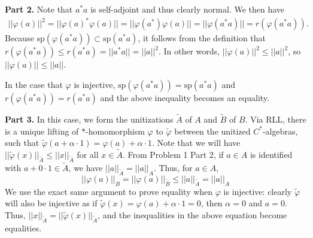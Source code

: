 \documentclass[aps,pra,showpacs,notitlepage,onecolumn,superscriptaddress,nofootinbib]{revtex4-1}
\theoremstyle{definition}
\begin{document}
\begin{comment}
If $\varphi$ is injective, then $\varphi : A \rightarrow B$ defines an isomorphism $\varphi^{-1} : \varphi(A) \rightarrow A$, where $\varphi^{-1}$ is easily verified to be a $*$-homomorphism, as $\varphi^{-1}(\lambda \varphi(a) + \varphi(b)) = \varphi^{-1}(\varphi(\lambda a + b) = \lambda a + b = \lambda \varphi^{-1}(\varphi(a)) + \varphi^{-1}(\varphi(b))$, $\varphi^{-1}(\varphi(a)\varphi(b)) = \varphi^{-1}(\varphi(ab)) = ab = \varphi^{-1}(\varphi(a)) \varphi^{-1}(\varphi(b))$, and $\varphi^{-1}(\varphi(a)^{*}) = \varphi^{-1}(\varphi(a^{*})) = a^{*} = \varphi^{-1}(\varphi(a))^{*}$,
so $\varphi^{-1}$ is linear, multiplicative, and $*$-preserving. Thus, using the previous result, $\text{sp}(a) = \text{sp}(\varphi^{-1}(\varphi(a))) \subset \text{sp}(\varphi(a))$
\end{comment}

\noindent \textbf{Part 2.} Note that $a^{*} a$ is self-adjoint and thus clearly normal. We then have
\begin{align}
  ||\varphi(a)||^2 = ||\varphi(a)^{*} \varphi(a)|| = ||\varphi(a^{*}) \varphi(a)|| = ||\varphi(a^{*} a)|| = r(\varphi(a^{*} a)).
\end{align}
Because $\text{sp}(\varphi(a^{*} a)) \subset \text{sp}(a^{*} a)$, it follows from the definition that $r(\varphi(a^{*} a)) \leq r(a^{*} a) = ||a^{*} a|| = ||a||^2$.
In other words, $||\varphi(a)||^2 \leq ||a||^2$, so $||\varphi(a)|| \leq ||a||$.

In the case that $\varphi$ is injective, $\text{sp}(\varphi(a^{*} a)) = \text{sp}(a^{*} a)$ and $r(\varphi(a^{*} a)) = r(a^{*} a)$ and the above inequality becomes an equality.
\newline

\noindent \textbf{Part 3.} In this case, we form the unitizations $\widetilde{A}$ of $A$ and $\widetilde{B}$ of $B$. Via RLL, there is a unique lifting of $*$-homomorphism $\varphi$ to $\widetilde{\varphi}$ between
the unitized $C^{*}$-algebras, such that $\widetilde{\varphi}(a + \alpha \cdot 1) = \varphi(a) + \alpha \cdot 1$. Note that we will have $||\widetilde{\varphi}(x)||_{\widetilde{A}} \leq ||x||_{\widetilde{A}}$ for all $x \in \widetilde{A}$. From
Problem 1 Part 2, if $a \in A$ is identified with $a + 0 \cdot 1 \in \widetilde{A}$, we have $||a||_{\widetilde{A}} = ||a||_{A}$. Thus, for $a \in A$,
\begin{equation}
  ||\varphi(a)||_{B} = ||\varphi(a)||_{\widetilde{B}} \leq ||a||_{\widetilde{A}} = ||a||_A
\end{equation}
We use the exact same argument to prove equality when $\varphi$ is injective: clearly $\widetilde{\varphi}$ will also be injective as if $\widetilde{\varphi}(x) = \varphi(a) + \alpha \cdot 1 = 0$, then $\alpha = 0$ and $a = 0$.
Thus, $||x||_{\widetilde{A}} = ||\widetilde{\varphi}(x)||_{\widetilde{A}}$, and the inequalities in the above equation become equalities.
\newline
\end{document}

